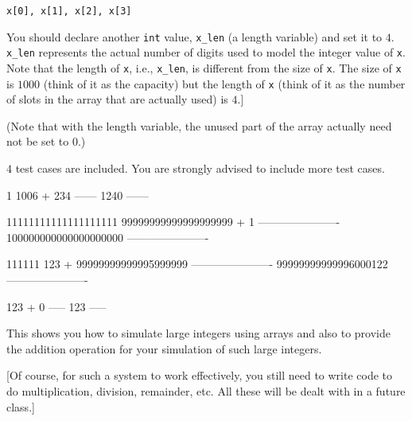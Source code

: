 \begin{center}
\verb!x[0], x[1], x[2], x[3]!
\end{center}

You should declare another \verb!int! value, \verb!x_len! (a length variable)
and set it to $4$. \verb!x_len! represents the actual number of digits used to
model the integer value of \verb!x!. Note that the length of \verb!x!, i.e.,
\verb!x_len!, is different from the size of \verb!x!. The size of \verb!x! is
$1000$ (think of it as the capacity) but the length of \verb!x! (think of it as
the number of slots in the array that are actually used) is $4$.]

(Note that with the length variable, the unused part of the array actually need
not be set to $0$.)

$4$ test cases are included. You are strongly advised to include more test
cases.

\resett
\nextt
\begin{console}[frame=single, commandchars=\\\{\}]

    1
  1006
+  234
------
  1240
------
\end{console}

\nextt
\begin{console}[frame=single, commandchars=\\\{\}]

 11111111111111111111
  99999999999999999999
+                    1
----------------------
 100000000000000000000
----------------------
\end{console}

\nextt
\begin{console}[frame=single, commandchars=\\\{\}]

               111111
                   123
+ 99999999999995999999
----------------------
  99999999999996000122
----------------------
\end{console}

\nextt
\begin{console}[frame=single, commandchars=\\\{\}]

  123
+   0
-----
  123
-----
\end{console}

This shows you how to simulate large integers using arrays and also to provide
the addition operation for your simulation of such large integers.

[Of course, for such a system to work effectively, you still need to write code
to do multiplication, division, remainder, etc. All these will be dealt with in
a future class.]
